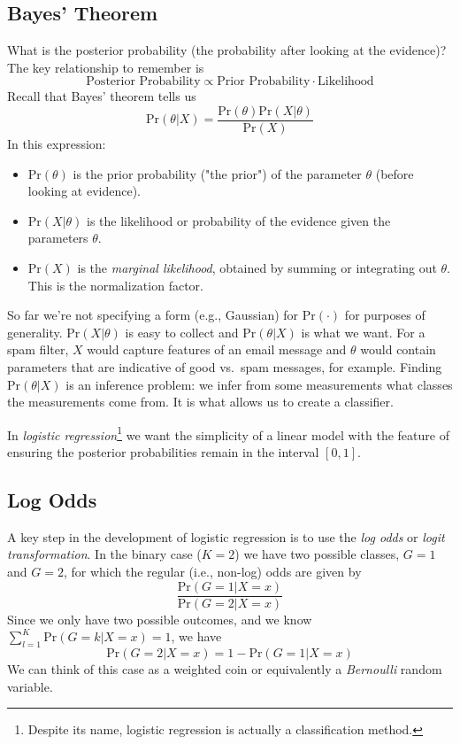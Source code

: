 \documentclass[a4paper]{article}
\begin{document}
\subsection{Bayes' Theorem}
What is the posterior probability (the probability after looking at the evidence)?  The key relationship to remember is
$$\text{Posterior Probability} \propto \text{Prior Probability}\cdot\text{Likelihood}$$
Recall that Bayes' theorem tells us
$$\text{Pr}(\theta|X) = \frac{\text{Pr}(\theta)\text{Pr}(X|\theta)}{\text{Pr}(X)}$$
In this expression: 
\begin{itemize}
\item $\text{Pr}(\theta)$ is the prior probability ("the prior") of the parameter $\theta $ (before looking at evidence).
\item $\text{Pr}(X|\theta)$ is the likelihood or probability of the evidence given the parameters $\theta$.
\item $\text{Pr}(X)$ is the \emph{marginal likelihood}, obtained by summing or integrating out $\theta$. This is the normalization factor.  
\end{itemize}
So far we're not specifying a form (e.g., Gaussian) for $\text{Pr}(\cdot)$ for purposes of generality. $\text{Pr}(X|\theta)$ is easy to collect and $\text{Pr}(\theta|X)$ is what we want. For a spam filter, $X$ would capture features of an email message and $\theta$ would contain parameters that are indicative of good vs.\ spam messages, for example. Finding $\text{Pr}(\theta|X)$ is an inference problem: we infer from some measurements what classes the measurements come from. It is what allows us to create a classifier.

In \emph{logistic regression}\footnote{Despite its name, logistic regression is actually a classification method.} we want the simplicity of a linear model with the feature of ensuring the posterior probabilities remain in the interval $[0,1]$.

\subsection{Log Odds}
A key step in the development of logistic regression is to use the \emph{log odds} or \emph{logit transformation}.  In the binary case ($K=2$) we have two possible classes, $G=1$ and $G=2$, for which the regular (i.e., non-log) odds are given by 
$$\frac{\text{Pr}(G=1|X=x)}{\text{Pr}(G=2|X=x)}$$
Since we only have two possible outcomes, and we know 
$\sum_{l=1}^K \text{Pr}(G=k|X=x)=1$, we have
\begin{equation}
\label{eqn:bernprob}
\text{Pr}(G=2|X=x)=1-\text{Pr}(G=1|X=x)
\end{equation}
We can think of this case as a weighted coin or equivalently a \emph{Bernoulli} random variable.
\end{document}
